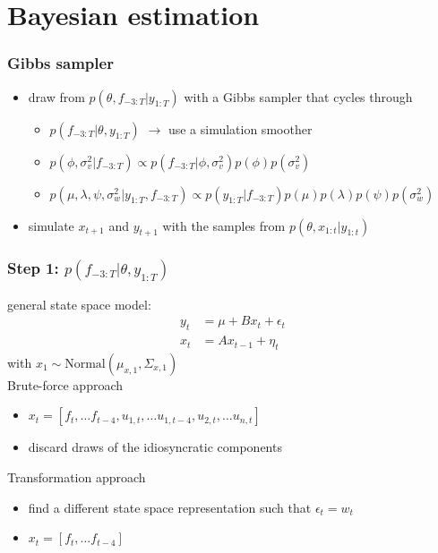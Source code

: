 \documentclass{beamer}
\begin{document}
\section{Bayesian estimation}

\begin{frame}
\frametitle{Gibbs sampler}
\begin{itemize}
\item draw from $p(\theta, f_{-3:T}|y_{1:T})$ with a Gibbs sampler that cycles through
\begin{itemize}
\normalsize
\vspace{4mm}
\item $p(f_{-3:T}|\theta, y_{1:T})$ $\rightarrow$ use a simulation smoother
\vspace{4mm}
\item $p(\phi, \sigma_{v}^2|f_{-3:T}) \propto p(f_{-3:T}|\phi, \sigma_{v}^2) p(\phi) p(\sigma_v^2)$
\vspace{4mm}
\item $p(\mu, \lambda, \psi, \sigma_{w}^2|y_{1:T}, f_{-3:T}) \propto p(y_{1:T}|f_{-3:T}) p(\mu) p(\lambda) p(\psi) p(\sigma_{w}^2)$
\vspace{4mm}
\end{itemize}
\item simulate $x_{t+1}$ and $y_{t+1}$ with the samples from $p(\theta, x_{1:t}|y_{1:t})$
\end{itemize}
\end{frame}

\begin{frame}
\frametitle{Step 1: $p(f_{-3:T}|\theta, y_{1:T})$}
general state space model:
\begin{align}
\label{eqn:ssm_obs}
y_t &= \mu + B x_t + \epsilon_t \\
x_t &= A x_{t-1} + \eta_t
\end{align}
with $x_1\sim \mathrm{Normal}(\mu_{x,1}, \Sigma_{x,1})$\\
\vspace{0.5cm}
Brute-force approach
\begin{itemize}
\item $x_t = [f_t, \dots f_{t-4}, u_{1,t}, \dots u_{1, t-4}, u_{2,t}, \dots u_{n,t}]$
\item discard draws of the idiosyncratic components
\end{itemize}
\vspace{0.5cm}
Transformation approach
\begin{itemize}
\item find a different state space representation such that $\epsilon_t=w_t$
\item $x_t = [f_t, \dots f_{t-4}]$
\end{itemize}
\end{frame}
\end{document}
